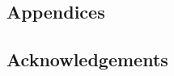 \clearpage
\begin{appendices}
\appendix
\renewcommand{\chaptermark}[1]{\markboth{\MakeUppercase{Appendices \hfill \chaptername\ \thechapter.\ #1}}{}}
\part*{Appendices}

\end{appendices}
\printbibliography
\clearpage

%
\renewcommand{\chaptermark}[1]{\markboth{\MakeUppercase{Acknowledgements}}{}}
\chapter*{Acknowledgements}
\pagestyle{plain}

% 

%

% 


